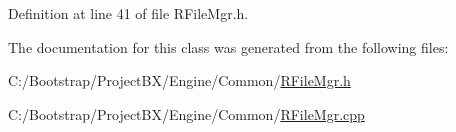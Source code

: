 Definition at line 41 of file RFileMgr.h.

The documentation for this class was generated from the following files:\begin{CompactItemize}
\item 
C:/Bootstrap/ProjectBX/Engine/Common/\hyperlink{_r_file_mgr_8h}{RFileMgr.h}\item 
C:/Bootstrap/ProjectBX/Engine/Common/\hyperlink{_r_file_mgr_8cpp}{RFileMgr.cpp}\end{CompactItemize}
